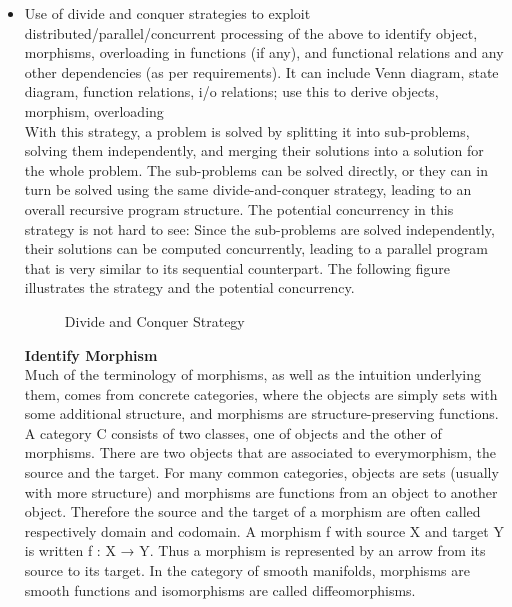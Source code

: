 \documentclass[12pt,a4paper]{report}
\begin{document}
\begin{appendices}
\begin{itemize}
	\item Use of divide and conquer strategies to exploit distributed/parallel/concurrent processing of the above to identify object, morphisms, overloading in functions (if any), and functional relations and any other dependencies (as per requirements). It can include Venn diagram, state diagram, function relations, i/o relations; use this to derive objects, morphism,
	overloading\\
	\hspace{0.5 in}With this strategy, a problem is solved by splitting it into sub-problems, solving them independently, and merging their solutions into a solution for the whole problem. The sub-problems can be solved directly, or they can in turn be solved using the same divide-and-conquer strategy, leading to an overall recursive program structure. The potential concurrency in this strategy is not hard to see: Since the sub-problems are solved independently, their solutions can be computed concurrently, leading to a parallel program that is very similar to its sequential counterpart. The following figure illustrates the strategy and the potential concurrency.
	\begin{figure}[!h]
		\begin{center}
		\caption{Divide and Conquer Strategy}
		\end{center}
	\end{figure}
	\textbf{Identify Morphism}\\
	\hspace{0.5 in}Much of the terminology of morphisms, as well as the intuition underlying them, comes from concrete categories, where the objects are simply sets with some additional structure, and morphisms are structure-preserving functions.
	\hspace{0.5 in}A category C consists of two classes, one of objects and the other of morphisms.
	There are two objects that are associated to everymorphism, the source and the target.
	\hspace{0.5 in}For many common categories, objects are sets (usually with more structure) and morphisms are functions from an object to another object. Therefore the source and the target of a morphism are often called respectively domain and codomain.
	\hspace{0.5 in}A morphism f with source X and target Y is written f : X → Y. Thus a morphism is represented by an arrow from its source to its target.
	In the category of smooth manifolds, morphisms are smooth functions and isomorphisms are called diffeomorphisms.
	

\end{itemize}
\end{appendices}
\end{document}
